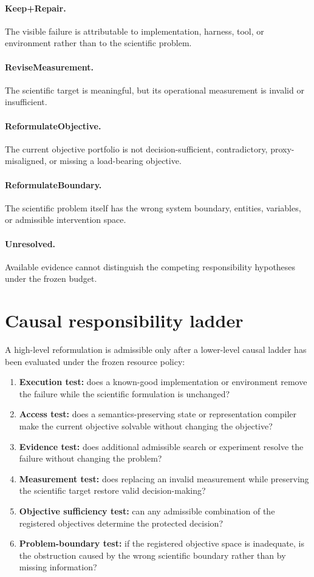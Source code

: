 \documentclass[11pt]{article}
\begin{document}
\paragraph{Keep+Repair.}
The visible failure is attributable to implementation, harness, tool, or environment rather than to the scientific problem.

\paragraph{ReviseMeasurement.}
The scientific target is meaningful, but its operational measurement is invalid or insufficient.

\paragraph{ReformulateObjective.}
The current objective portfolio is not decision-sufficient, contradictory, proxy-misaligned, or missing a load-bearing objective.

\paragraph{ReformulateBoundary.}
The scientific problem itself has the wrong system boundary, entities, variables, or admissible intervention space.

\paragraph{Unresolved.}
Available evidence cannot distinguish the competing responsibility hypotheses under the frozen budget.

\section{Causal responsibility ladder}
A high-level reformulation is admissible only after a lower-level causal ladder has been evaluated under the frozen resource policy:
\begin{enumerate}[leftmargin=*]
    \item \textbf{Execution test:} does a known-good implementation or environment remove the failure while the scientific formulation is unchanged?
    \item \textbf{Access test:} does a semantics-preserving state or representation compiler make the current objective solvable without changing the objective?
    \item \textbf{Evidence test:} does additional admissible search or experiment resolve the failure without changing the problem?
    \item \textbf{Measurement test:} does replacing an invalid measurement while preserving the scientific target restore valid decision-making?
    \item \textbf{Objective sufficiency test:} can any admissible combination of the registered objectives determine the protected decision?
    \item \textbf{Problem-boundary test:} if the registered objective space is inadequate, is the obstruction caused by the wrong scientific boundary rather than by missing information?
\end{enumerate}
\end{document}
